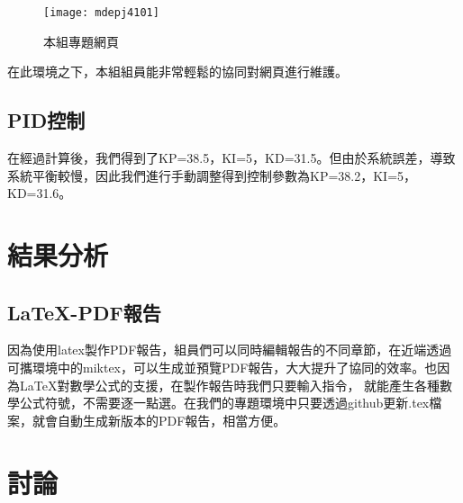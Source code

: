 \begin{figure}[h]
    \centering
    \texttt{[image: mdepj4101]}
    \caption{本組專題網頁}
\end{figure}

在此環境之下，本組組員能非常輕鬆的協同對網頁進行維護。\\




\subsection{PID控制}
在經過計算後，我們得到了KP=38.5，KI=5，KD=31.5。但由於系統誤差，導致系統平衡較慢，因此我們進行手動調整得到控制參數為KP=38.2，KI=5，KD=31.6。



\section{結果分析}

\subsection{LaTeX-PDF報告}
因為使用latex製作PDF報告，組員們可以同時編輯報告的不同章節，在近端透過可攜環境中的miktex，可以生成並預覽PDF報告，大大提升了協同的效率。也因為LaTeX對數學公式的支援，在製作報告時我們只要輸入指令，
就能產生各種數學公式符號，不需要逐一點選。在我們的專題環境中只要透過github更新.tex檔案，就會自動生成新版本的PDF報告，相當方便。
\subsection{}
\subsection{}

\section{討論}
\subsection{}
\subsection{}
\subsection{}